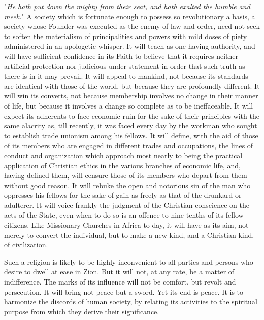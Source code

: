 \documentclass{book}
\begin{document}
"\emph{He hath put down the mighty from their seat, and hath exalted the humble and meek.}" A society which is fortunate enough to possess so revolutionary a basis, a society whose Founder was executed as the enemy of law and order, need not seek to soften the materialism of principalities and powers with mild doses of piety administered in an apologetic whisper. It will teach as one having authority, and will have sufficient confidence in its Faith to believe that it requires neither artificial protection nor judicious under-statement in order that such truth as there is in it may prevail. It will appeal to mankind, not because its standards are identical with those of the world, but because they are profoundly different. It will win its converts, not because membership involves no change in their manner of life, but because it involves a change so complete as to be ineffaceable. It will expect its adherents to face economic ruin for the sake of their principles with the same alacrity as, till recently, it was faced every day by the workman who sought to establish trade unionism among his fellows. It will define, with the aid of those of its members who are engaged in different trades and occupations, the lines of conduct and organization which approach most nearly to being the practical application of Christian ethics in the various branches of economic life, and, having defined them, will censure those of its members who depart from them without good reason. It will rebuke the open and notorious sin of the man who oppresses his fellows for the sake of gain as freely as that of the drunkard or adulterer. It will voice frankly the judgment of the Christian conscience on the acts of the State, even when to do so is an offence to nine-tenths of its fellow-citizens. Like Missionary Churches in Africa to-day, it will have as its aim, not merely to convert the individual, but to make a new kind, and a Christian kind, of civilization.

Such a religion is likely to be highly inconvenient to all parties and persons who desire to dwell at ease in Zion. But it will not, at any rate, be a matter of indifference. The marks of its influence will not be comfort, but revolt and persecution. It will bring not peace but a sword. Yet its end is peace. It is to harmonize the discords of human society, by relating its activities to the spiritual purpose from which they derive their significance.
\end{document}
